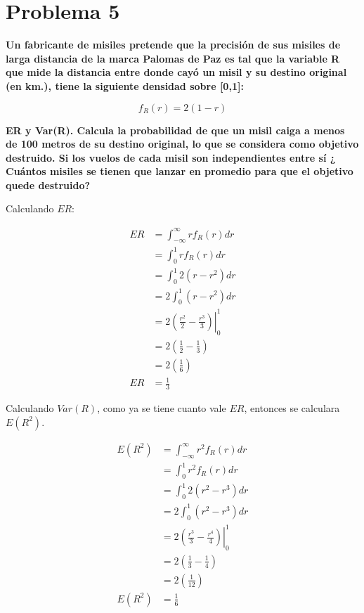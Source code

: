 \section*{Problema 5}

\textbf{Un fabricante de misiles pretende que la precisión de sus misiles de larga distancia de la marca Palomas de Paz es tal que la variable R que mide la distancia entre donde cayó un misil y su destino original (en km.), tiene la siguiente densidad sobre [0,1]:}

\begin{equation*}
    f_R(r) = 2(1-r)
\end{equation*}

\textbf{ER y Var(R). Calcula la probabilidad de que un misil caiga a menos de 100 metros de su destino original, lo que se considera como objetivo destruido. Si los vuelos de cada misil son independientes entre sí ¿ Cuántos misiles se tienen que lanzar en promedio para que el objetivo quede destruido?}

Calculando $ER$:

\begin{align*}
    ER & = \int_{-\infty}^\infty rf_R(r)dr                                 \\
       & =\int_{0}^1 rf_R(r)dr                                             \\
       & = \int_0^1 2(r-r^2)dr                                             \\
       & = 2 \int_0^1 (r-r^2)dr                                            \\
       & = 2 \left.\left( \frac{r^2}{2} - \frac{r^3}{3} \right)\right|_0^1 \\
       & = 2 \left(\frac{1}{2}- \frac{1}{3} \right)                        \\
       & = 2 \left(\frac{1}{6}\right)                                      \\
    ER & = \frac{1}{3}
\end{align*}

Calculando $Var(R)$, como ya se tiene cuanto vale $ER$, entonces se calculara $E(R^2)$.

\begin{align*}
    E(R^2) & =\int_{-\infty}^\infty r^2f_R(r)dr                             \\
           & = \int_{0}^1 r^2f_R(r)dr                                       \\
           & = \int_0^1 2(r^2-r^3) dr                                       \\
           & = 2\int_0^1 (r^2-r^3) dr                                       \\
           & = 2\left.\left( \frac{r^3}{3}- \frac{r^4}{4}\right)\right|_0^1 \\
           & = 2\left(\frac{1}{3} -\frac{1}{4} \right)                      \\
           & = 2\left( \frac{1}{12}\right)                                  \\
    E(R^2) & = \frac{1}{6}
\end{align*}


